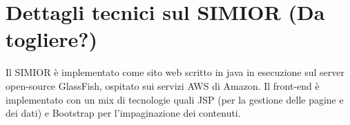 \section{Dettagli tecnici sul SIMIOR (Da togliere?)}
Il SIMIOR è implementato come sito web scritto in java in esecuzione sul server open-source GlassFish, ospitato sui servizi AWS di Amazon. Il front-end è implementato con un mix di tecnologie quali JSP (per la gestione delle pagine e dei dati) e Bootstrap per l'impaginazione dei contenuti.





%
%


